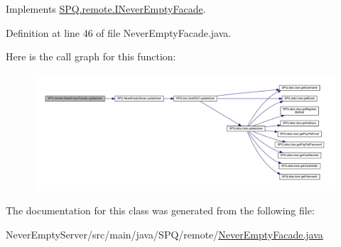 Implements \mbox{\hyperlink{interface_s_p_q_1_1remote_1_1_i_never_empty_facade_add6dafb25f59c549e924c76c6e8f31c6}{S\+P\+Q.\+remote.\+I\+Never\+Empty\+Facade}}.



Definition at line 46 of file Never\+Empty\+Facade.\+java.

Here is the call graph for this function\+:\nopagebreak
\begin{figure}[H]
\begin{center}
\leavevmode
\includegraphics[width=350pt]{class_s_p_q_1_1remote_1_1_never_empty_facade_a55ad685d3c176424a7f5f18e5ebe043b_cgraph}
\end{center}
\end{figure}


The documentation for this class was generated from the following file\+:\begin{DoxyCompactItemize}
\item 
Never\+Empty\+Server/src/main/java/\+S\+P\+Q/remote/\mbox{\hyperlink{_never_empty_facade_8java}{Never\+Empty\+Facade.\+java}}\end{DoxyCompactItemize}
